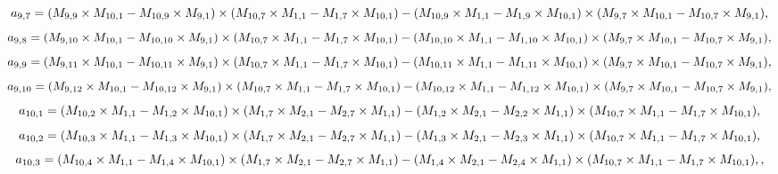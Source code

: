 \documentclass[10pt]{asme2ej}
\begin{document}
\begin{landscape}
\begin{equation}
    a_{9,7} = (M_{9,9}\times M_{10,1}-M_{10,9}\times M_{9,1})\times (M_{10,7}\times M_{1,1}-M_{1,7}\times M_{10,1})\\-(M_{10,9}\times M_{1,1}-M_{1,9}\times M_{10,1})\times (M_{9,7}\times M_{10,1}-M_{10,7}\times M_{9,1}),
\end{equation}
\begin{equation}
    a_{9,8} = (M_{9,10}\times M_{10,1}-M_{10,10}\times M_{9,1})\times (M_{10,7}\times M_{1,1}-M_{1,7}\times M_{10,1})\\-(M_{10,10}\times M_{1,1}-M_{1,10}\times M_{10,1})\times (M_{9,7}\times M_{10,1}-M_{10,7}\times M_{9,1}),
\end{equation}
\begin{equation}
    a_{9,9} = (M_{9,11}\times M_{10,1}-M_{10,11}\times M_{9,1})\times (M_{10,7}\times M_{1,1}-M_{1,7}\times M_{10,1})\\-(M_{10,11}\times M_{1,1}-M_{1,11}\times M_{10,1})\times (M_{9,7}\times M_{10,1}-M_{10,7}\times M_{9,1}),
\end{equation}
\begin{equation}
    a_{9,10} = (M_{9,12}\times M_{10,1}-M_{10,12}\times M_{9,1})\times (M_{10,7}\times M_{1,1}-M_{1,7}\times M_{10,1})\\-(M_{10,12}\times M_{1,1}-M_{1,12}\times M_{10,1})\times (M_{9,7}\times M_{10,1}-M_{10,7}\times M_{9,1}),
\end{equation}
\begin{equation}
    a_{10,1} = (M_{10,2}\times M_{1,1}-M_{1,2}\times M_{10,1})\times (M_{1,7}\times M_{2,1}-M_{2,7}\times M_{1,1})\\-(M_{1,2}\times M_{2,1}-M_{2,2}\times M_{1,1})\times (M_{10,7}\times M_{1,1}-M_{1,7}\times M_{10,1}),
\end{equation}
\begin{equation}
    a_{10,2} = (M_{10,3}\times M_{1,1}-M_{1,3}\times M_{10,1})\times (M_{1,7}\times M_{2,1}-M_{2,7}\times M_{1,1})\\-(M_{1,3}\times M_{2,1}-M_{2,3}\times M_{1,1})\times (M_{10,7}\times M_{1,1}-M_{1,7}\times M_{10,1}),
\end{equation}
\begin{equation}
    a_{10,3} = (M_{10,4}\times M_{1,1}-M_{1,4}\times M_{10,1})\times (M_{1,7}\times M_{2,1}-M_{2,7}\times M_{1,1})\\-(M_{1,4}\times M_{2,1}-M_{2,4}\times M_{1,1})\times (M_{10,7}\times M_{1,1}-M_{1,7}\times M_{10,1}),,
\end{equation}

\end{landscape}
\end{document}
